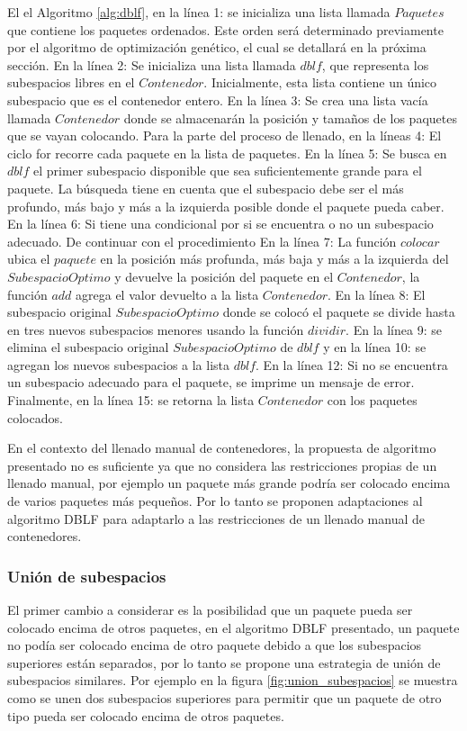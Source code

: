 \documentclass[openany]{article}
\begin{document}
El el Algoritmo \ref{alg:dblf}, en la línea 1: se inicializa una lista llamada $Paquetes$ que contiene los paquetes ordenados. Este orden será determinado previamente por el algoritmo de optimización genético, el cual se detallará en la próxima sección. En la línea 2: Se inicializa una lista llamada $dblf$, que representa los subespacios libres en el $Contenedor$. Inicialmente, esta lista contiene un único subespacio que es el contenedor entero. En la línea 3: Se crea una lista vacía llamada $Contenedor$ donde se almacenarán la posición y tamaños de los paquetes que se vayan colocando. Para la parte del proceso de llenado, en la líneas 4: El ciclo for recorre cada paquete en la lista de paquetes.
En la línea 5: Se busca en $dblf$ el primer subespacio disponible que sea suficientemente grande para el paquete. La búsqueda tiene en cuenta que el subespacio debe ser el más profundo, más bajo y más a la izquierda posible donde el paquete pueda caber. En la línea 6: Si tiene una condicional por si se encuentra o no un subespacio adecuado. De continuar con el procedimiento En la línea 7: La función $colocar$ ubica el $paquete$ en la posición más profunda, más baja y más a la izquierda del $SubespacioOptimo$ y devuelve la posición del paquete en el $Contenedor$, la función $add$ agrega el valor devuelto a la lista $Contenedor$. En la línea 8: El subespacio original $SubespacioOptimo$ donde se colocó el paquete se divide hasta en tres nuevos subespacios menores usando la función $dividir$. En la línea 9: se elimina el subespacio original $SubespacioOptimo$ de $dblf$ y en la línea 10: se agregan los nuevos subespacios a la lista $dblf$. En la línea 12: Si no se encuentra un subespacio adecuado para el paquete, se imprime un mensaje de error. Finalmente, en la línea 15: se retorna la lista $Contenedor$ con los paquetes colocados.

En el contexto del llenado manual de contenedores, la propuesta de algoritmo presentado no es suficiente ya que no considera las restricciones propias de un llenado manual, por ejemplo un paquete más grande podría ser colocado encima de varios paquetes más pequeños. Por lo tanto se proponen adaptaciones al algoritmo DBLF para adaptarlo a las restricciones de un llenado manual de contenedores.

\subsubsection{Unión de subespacios}

El primer cambio a considerar es la posibilidad que un paquete pueda ser colocado encima de otros paquetes, en el algoritmo DBLF presentado, un paquete no podía ser colocado encima de otro paquete debido a que los subespacios superiores están separados, por lo tanto se propone una estrategia de unión de subespacios similares. Por ejemplo en la figura \ref{fig:union_subespacios} se muestra como se unen dos subespacios superiores para permitir que un paquete de otro tipo pueda ser colocado encima de otros paquetes.
\end{document}
